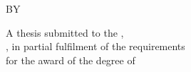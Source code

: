 \begin{titlepage}
  \centering
  {\Large\bfseries\MakeUppercase{\ThesisTitle}\par}
  \vspace{2.5cm}
  {\large BY\par}
  \vspace{0.8cm}
  {\large\bfseries\MakeUppercase{\ThesisAuthor}\par}
  \vspace{2.5cm}
  {A thesis submitted to the \ThesisDepartment,\\
   \ThesisUniversity, in partial fulfilment of the requirements\\
   for the award of the degree of\\[0.5em]
   \textbf{\ThesisDegree}\par}
  \vspace{0.5em}
  {\small{}\par}
  \vfill
  {\large\MakeUppercase{\ThesisDepartment}\\
   \MakeUppercase{\ThesisUniversity}\\
   \ThesisPlace\par}
  \vspace{1cm}
  {\large\ThesisDate\par}
\end{titlepage}
